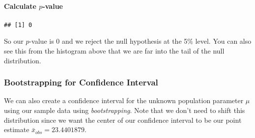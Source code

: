 \documentclass[]{tufte-book}
\newenvironment{Shaded}{\begin{snugshade}}{\end{snugshade}}
\newcommand{\KeywordTok}[1]{\textcolor[rgb]{0.13,0.29,0.53}{\textbf{{#1}}}}
\newcommand{\DataTypeTok}[1]{\textcolor[rgb]{0.13,0.29,0.53}{{#1}}}
\newcommand{\DecValTok}[1]{\textcolor[rgb]{0.00,0.00,0.81}{{#1}}}
\newcommand{\StringTok}[1]{\textcolor[rgb]{0.31,0.60,0.02}{{#1}}}
\newcommand{\OtherTok}[1]{\textcolor[rgb]{0.56,0.35,0.01}{{#1}}}
\newcommand{\NormalTok}[1]{{#1}}
\begin{document}
\paragraph{\texorpdfstring{Calculate
\(p\)-value}{Calculate p-value}}\label{calculate-p-value}

\begin{Shaded}
\end{Shaded}

\begin{verbatim}
## [1] 0
\end{verbatim}

So our \(p\)-value is 0 and we reject the null hypothesis at the 5\%
level. You can also see this from the histogram above that we are far
into the tail of the null distribution.

\subsubsection{Bootstrapping for Confidence
Interval}\label{bootstrapping-for-confidence-interval}

We can also create a confidence interval for the unknown population
parameter \(\mu\) using our sample data using \emph{bootstrapping}. Note
that we don't need to shift this distribution since we want the center
of our confidence interval to be our point estimate
\(\bar{x}_{obs} = 23.4401879\).

\begin{Shaded}
\end{Shaded}

\begin{Shaded}
\end{Shaded}
\end{document}
